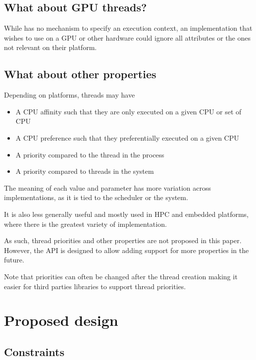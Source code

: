 \documentclass{wg21}
\begin{document}
\subsection{What about GPU threads?}

While  has no mechanism to specify an execution context, an implementation that wishes
to use  on a GPU or other hardware could ignore all attributes or the ones not relevant on their platform.

\subsection{What about other properties}

Depending on platforms, threads may have

\begin{itemize}
\item A CPU affinity such that they are only executed on a given CPU or set of CPU
\item A CPU preference such that they preferentially executed on a given CPU
\item A priority compared to the thread in the process
\item A priority compared to threads in the system
\end{itemize}

The meaning of each value and parameter has more variation across implementations,
as it is tied to the scheduler or the system.

It is also less generally useful and mostly used in HPC and embedded platforms, where there is the greatest variety of implementation.

As such, thread priorities and other properties are not proposed in this paper.
However, the API is designed to allow adding support for more properties in the future.

Note that priorities can often be changed after the thread creation making it easier for third
parties libraries to support thread priorities.


\section{Proposed design}

\subsection{Constraints}
\end{document}
